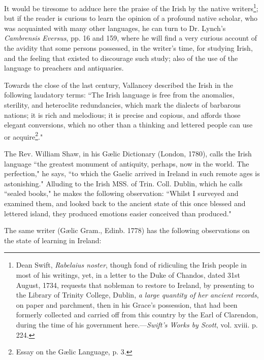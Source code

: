 \documentclass[11pt,oneside]{memoir}
\begin{document}
It would be tiresome to adduce here the praise of the Irish by the native writers\footnote{
    Dean Swift, \textit{Rabelaius noster}, though fond of ridiculing the Irish people in most of his writings, yet, in a letter to the Duke of Chandos, dated 31st August, 1734, requests that nobleman to restore to Ireland, by presenting to the Library of Trinity College, Dublin, \textit{a large quantity of her ancient records}, on paper and parchment, then in his Grace's possession, that had been formerly collected and carried off from this country by the Earl of Clarendon, during the time of his government here.---\textit{Swift's Works by Scott}, vol. xviii. p. 224.
}; but if the reader is curious to learn the opinion of a profound native scholar, who was acquainted with many other languages, he can turn to Dr. Lynch's \textit{Cambrensis Eversus}, pp. 16 and 159, where he will find a very curious account of the avidity that some persons possessed, in the writer's time, for studying Irish, and the feeling that existed to discourage such study; also of the use of the language to preachers and antiquaries.

Towards the close of the last century, Vallancey described the Irish in the following laudatory terms:
``The Irish language is free from the anomalies, sterility, and heteroclite redundancies, which mark the dialects of barbarous nations; it is rich and melodious; it is precise and copious, and affords those elegant conversions, which no other than a thinking and lettered people can use or acquire\footnote{
    Essay on the Gælic Language, p. 3.
}."

The Rev. William Shaw, in his Gælic Dictionary (London, 1780), calls the Irish language ``the greatest monument of antiquity, perhaps, now in the world. The perfection," he says, ``to which the Gaelic arrived in Ireland in such remote ages is astonishing."
Alluding to the Irish MSS. of Trin. Coll. Dublin, which he calls ``sealed books," he makes the following observation: ``Whilst I surveyed and examined them, and looked back to the ancient state of this once blessed and lettered island, they produced emotions easier conceived than produced."

The same writer (Gælic Gram., Edinb. 1778) has the following observations on the state of learning in Ireland:
\end{document}

